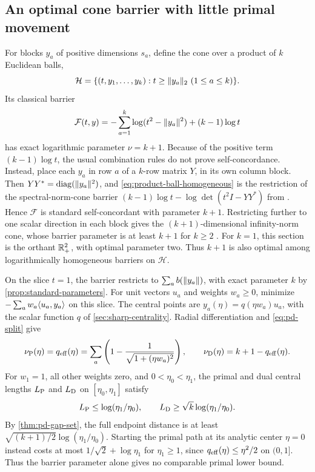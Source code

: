 \subsection{An optimal cone barrier with little primal movement}
For blocks $y_a$ of positive dimensions $s_a$, define the cone over a
product of $k$ Euclidean balls,
\[
 \mathcal H=\{(t,y_1,\ldots,y_k):t\geq\lVert y_a\rVert_2\ (1\leq a\leq k)\}.
\]
Its classical barrier
\begin{equation}
 \mathcal F(t,y)=-\sum_{a=1}^k\log(t^2-\lVert y_a\rVert^2)+(k-1)\log t
 \label{eq:product-ball-homogeneous}
\end{equation}
has exact logarithmic parameter $\nu=k+1$.
Because of the positive term $(k-1)\log t$, the usual combination
rules do not prove self-concordance. Instead, place each $y_a$ in row $a$ of a $k$-row matrix $Y$, in its own
column block. Then $YY^*=\operatorname{diag}(\lVert y_a\rVert^2)$,
and \eqref{eq:product-ball-homogeneous} is the restriction of the
spectral-norm-cone barrier
$(k-1)\log t-\log\det(t^2I-YY^*)$ from
\cite[Proposition~5.4.6(i), p.~199]{NesterovNemirovskii1994}.
Hence $\mathcal F$ is standard self-concordant with parameter $k+1$. Restricting further to one scalar direction in each block gives
the $(k+1)$-dimensional infinity-norm cone, whose barrier parameter is
at least $k+1$ for $k\geq2$ \cite[Corollary~6.2]{Hildebrand2013}. For
$k=1$, this section is the orthant $\mathbb R_+^2$, with optimal parameter
two. Thus $k+1$ is also optimal among logarithmically homogeneous
barriers on $\mathcal H$.

On the slice $t=1$, the barrier restricts to $\sum_a b(\lVert y_a\rVert)$,
with exact parameter $k$ by \cref{prop:standard-parameters}.
For unit vectors $u_a$ and weights $w_a\geq0$, minimize
$-\sum_aw_a\langle u_a,y_a\rangle$ on this slice. The central points are
$y_a(\eta)=q(\eta w_a)u_a$, with the scalar function $q$ of
\cref{sec:sharp-centrality}. Radial differentiation and
\eqref{eq:pd-split} give
\begin{equation}
 \nu_{\rm P}(\eta)=q_{\rm eff}(\eta)
 =\sum_a\left(1-\frac1{\sqrt{1+(\eta w_a)^2}}\right),\qquad
 \nu_{\rm D}(\eta)=k+1-q_{\rm eff}(\eta).
 \label{eq:product-ball-allocation}
\end{equation}
For $w_1=1$, all other weights zero, and $0<\eta_0<\eta_1$, the primal
and dual central lengths $L_{\rm P}$ and $L_{\rm D}$ on
$[\eta_0,\eta_1]$ satisfy
\[
 L_{\rm P}\leq\log(\eta_1/\eta_0),\qquad
 L_{\rm D}\geq\sqrt{k}\log(\eta_1/\eta_0).
\]
By \cref{thm:pd-gap-set}, the full endpoint distance is at least $\sqrt{(k+1)/2}\log(\eta_1/\eta_0)$.
Starting the primal path at its analytic center $\eta=0$ instead costs
at most $1/\sqrt2+\log\eta_1$ for $\eta_1\geq1$, since
$q_{\rm eff}(\eta)\leq\eta^2/2$ on $(0,1]$.
Thus the barrier parameter alone gives no comparable primal lower bound.


